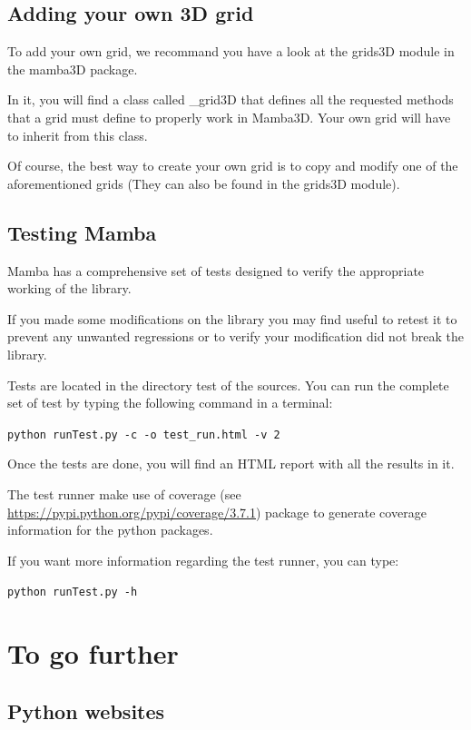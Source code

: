 \documentclass[a4paper,10pt,oneside]{article}
\begin{document}
\subsection{Adding your own 3D grid}
\label{cha:create_grid3D}

To add your own grid, we recommand you have a look at the grids3D module in
the mamba3D package.

In it, you will find a class called \_grid3D that defines all the requested
methods that a grid must define to properly work in Mamba3D. Your own grid
will have to inherit from this class.

Of course, the best way to create your own grid is to copy and modify one
of the aforementioned grids (They can also be found in the grids3D module).

\subsection{Testing Mamba}
\label{cha:testing_mamba}

Mamba has a comprehensive set of tests designed to verify the appropriate
working of the library.

If you made some modifications on the library you may find useful to retest it
to prevent any unwanted regressions or to verify your modification did not break
the library.

Tests are located in the directory test of the sources. You can run the complete
set of test by typing the following command in a terminal:

\texttt{python runTest.py -c -o test\_run.html -v 2}

Once the tests are done, you will find an HTML report with all the results in it.

The test runner make use of coverage (see \url{https://pypi.python.org/pypi/coverage/3.7.1})
package to generate coverage information for the python packages.

If you want more information regarding the test runner, you can type:

\texttt{python runTest.py -h}

\pagebreak

\appendix

\section{To go further}
\label{cha:to_go_further}
\subsection{Python websites}
\end{document}
